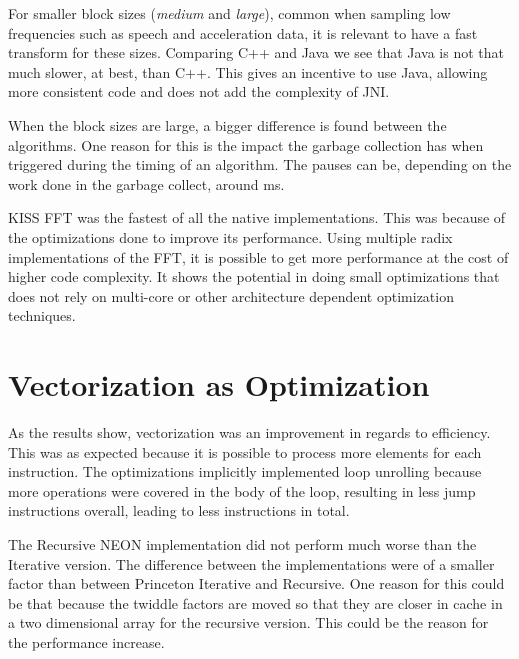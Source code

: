 
For smaller block sizes (\emph{medium} and \emph{large}), common when sampling low frequencies such as speech and acceleration data, it is relevant to have a fast transform for these sizes. Comparing C++ and Java we see that Java is not that much slower, at best, than C++. This gives an incentive to use Java, allowing more consistent code and does not add the complexity of JNI.

When the block sizes are large, a bigger difference is found between the algorithms. One reason for this is the impact the garbage collection has when triggered during the timing of an algorithm. The pauses can be, depending on the work done in the garbage collect, around  ms.


KISS FFT was the fastest of all the native implementations. This was because of the optimizations done to improve its performance. Using multiple radix implementations of the FFT, it is possible to get more performance at the cost of higher code complexity. It shows the potential in doing small optimizations that does not rely on multi-core or other architecture dependent optimization techniques.

\section{Vectorization as Optimization}

As the results show, vectorization was an improvement in regards to efficiency. This was as expected because it is possible to process more elements for each instruction. The optimizations implicitly implemented loop unrolling because more operations were covered in the body of the loop, resulting in less jump instructions overall, leading to less instructions in total.

The Recursive NEON implementation did not perform much worse than the Iterative version. The difference between the implementations were of a smaller factor than between Princeton Iterative and Recursive. One reason for this could be that because the twiddle factors are moved so that they are closer in cache in a two dimensional array for the recursive version. This could be the reason for the performance increase.

